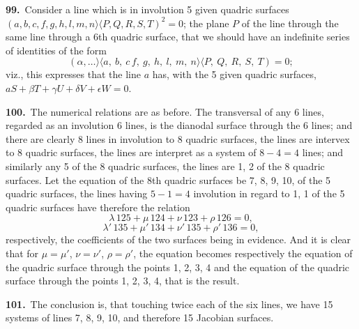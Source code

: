 \documentclass[11pt,a4paper]{article}
\newcommand{\bw}{\mathrel{\rangle\!\langle}}
\begin{document}
\medskip

\textbf{99.}\ Consider a line which is in involution 5 given quadric surfaces $(a, b, c, f, g, h, l, m, n \bw P, Q, R, S, T)^2 = 0$; the plane $P$ of the line through the same line through a 6th quadric surface, that we should have an indefinite series of identities of the form
\[
(\alpha,\ldots\bw a,\ b,\ c\, f,\ g,\ h,\ l,\ m,\ n \bw P,\ Q,\ R,\ S,\ T) = 0;
\]
viz., this expresses that the line $a$ has, with the 5 given quadric surfaces, $aS + \beta T + \gamma U + \delta V + \epsilon W = 0$.

\medskip

\textbf{100.}\ The numerical relations are as before. The transversal of any 6 lines, regarded as an involution 6 lines, is the dianodal surface through the 6 lines; and there are clearly 8 lines in involution to 8 quadric surfaces, the lines are intervex to 8 quadric surfaces, the lines are interpret as a system of $8 - 4 = 4$ lines; and similarly any 5 of the 8 quadric surfaces, the lines are 1, 2 of the 8 quadric surfaces. Let the equation of the 8th quadric surfaces be 7, 8, 9, 10, of the 5 quadric surfaces, the lines having $5 - 1 = 4$ involution in regard to 1, 1 of the 5 quadric surfaces have therefore the relation
\[
\lambda\,125 + \mu\,124 + \nu\,123 + \rho\,126 = 0,
\]
\[
\lambda'\,135 + \mu'\,134 + \nu'\,135 + \rho'\,136 = 0,
\]
respectively, the coefficients of the two surfaces being in evidence. And it is clear that for $\mu = \mu'$, $\nu = \nu'$, $\rho = \rho'$, the equation becomes respectively the equation of the quadric surface through the points 1, 2, 3, 4 and the equation of the quadric surface through the points 1, 2, 3, 4, that is the result.

\medskip

\textbf{101.}\ The conclusion is, that touching twice each of the six lines, we have 15 systems of lines 7, 8, 9, 10, and therefore 15 Jacobian surfaces.

\newpage
\setcounter{page}{173}
\end{document}
